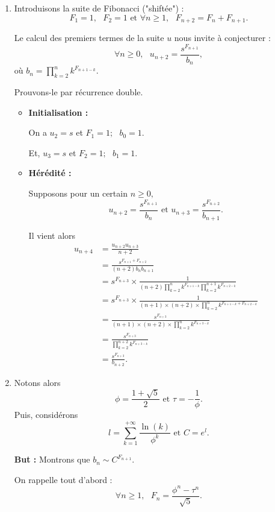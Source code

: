 \begin{enumerate}
\item Introduisons la suite de Fibonacci ("shiftée") :
$$F_{1}=1,\mbox { }F_{2}=1 \mbox{ et } \forall n\geq 1,\mbox{ } F_{n+2}=F_{n}+F_{n+1}.$$

Le calcul des premiers termes de la suite $u$ nous invite à conjecturer : $$\forall n\geq 0,\mbox{ } u_{n+2}=\frac{s^{F_{n+1}}}{b_{n}},$$ où $\displaystyle b_{n}=\prod_{k=2}^{n}k^{F_{n+1-k}}.$

Prouvons-le par récurrence double.

\begin{itemize}
 \item \textbf{Initialisation :}

On a $u_{2}=s$ et $F_{1}=1;\mbox{ }b_{0}=1.$

Et, $u_{3}=s$ et $F_{2}=1;\mbox{ }b_{1}=1.$

\item \textbf{Hérédité : }

Supposons pour un certain $n\geq 0,$ $$u_{n+2}=\frac{s^{F_{n+1}}}{b_{n}} \mbox{ et } u_{n+3}=\frac{s^{F_{n+2}}}{b_{n+1}}.$$

Il vient alors 
\begin{align*}
u_{n+4} & =\frac{u_{n+2}u_{n+3}}{n+2}\\
& =\frac{s^{F_{n+1}+F_{n+2}}}{(n+2)b_{n}b_{n+1}}\\
& =s^{F_{n+3}}\times \frac{1}{(n+2)\prod_{k=2}^{n}k^{F_{n+1-k}}\prod_{k=2}^{n+1}k^{F_{n+2-k}}}\\
& = s^{F_{n+3}}\times \frac{1}{(n+1) \times (n+2)\times \prod_{k=2}^{n}k^{F_{n+1-k}+F_{n+2-k}}}\\
& =\frac{s^{F_{n+3}}}{(n+1)\times (n+2)\times \prod_{k=2}^{n}k^{F_{n+3-k}}}\\
& =\frac{s^{F_{n+3}}}{\prod_{k=2}^{n+2}k^{F_{n+3-k}}}\\
& = \frac{s^{F_{n+3}}}{b_{n+2}}.
\end{align*}
\end{itemize}

\item Notons alors $$\phi=\frac{1+\sqrt{5}}{2} \mbox{ et } \tau=-\frac{1}{\phi}.$$
Puis, considérons $$l=\sum_{k=1}^{+\infty}\frac{\ln(k)}{\phi^{k}} \mbox{ et } C=e^{l}.$$

\textbf{But : } Montrons que $\displaystyle b_{n}\sim C^{F_{n+1}}.$

On rappelle tout d'abord : $$\forall n\geq 1,\mbox{ } F_{n}=\frac{\phi^{n}-\tau^{n}}{\sqrt{5}}.$$


\end{enumerate}
